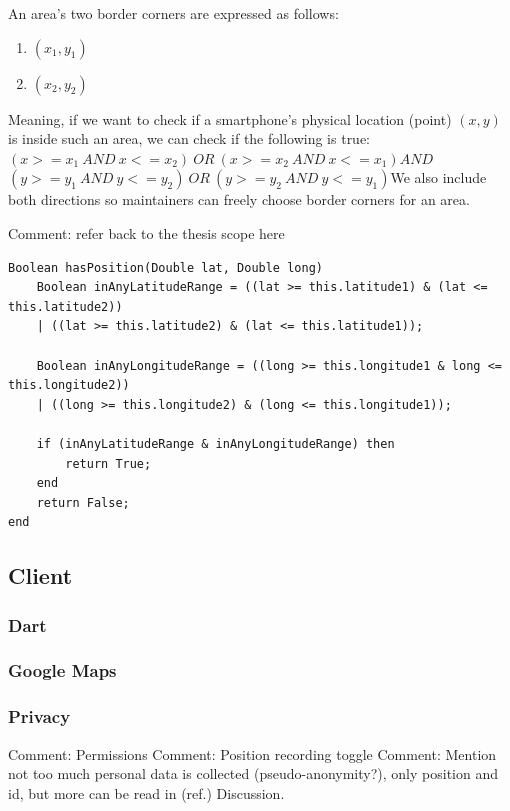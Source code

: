 \documentclass{article}
\begin{document}
An area's two border corners are expressed as follows:
\begin{enumerate}
    \item $(x_1, y_1)$
    \item $(x_2, y_2)$
\end{enumerate}
Meaning, if we want to check if a smartphone's physical location (point) $(x, y)$ is inside such an area, we can check if the following is true:\newline\newline$(x >= x_1\:AND\: x <= x_2)\:OR\:(x >= x_2\:AND\:x <= x_1)$\newline$AND$\newline$(y >= y_1\:AND\:y <= y_2)\:OR\:(y >= y_2\:AND\:y <= y_1)$\newline We also include both directions so maintainers can freely choose border corners for an area. 

Comment: refer back to the thesis scope here
\begin{verbatim}
Boolean hasPosition(Double lat, Double long)
    Boolean inAnyLatitudeRange = ((lat >= this.latitude1) & (lat <= this.latitude2)) 
    | ((lat >= this.latitude2) & (lat <= this.latitude1));
    
    Boolean inAnyLongitudeRange = ((long >= this.longitude1 & long <= this.longitude2)) 
    | ((long >= this.longitude2) & (long <= this.longitude1));

    if (inAnyLatitudeRange & inAnyLongitudeRange) then
        return True;
    end
    return False;
end
\end{verbatim}

\subsection{Client}
\subsubsection{Dart}
\subsubsection{Google Maps}
\subsubsection{Privacy}
Comment: Permissions
Comment: Position recording toggle
Comment: Mention not too much personal data is collected (pseudo-anonymity?), only position and id, but more can be read in (ref.) Discussion.
\end{document}
